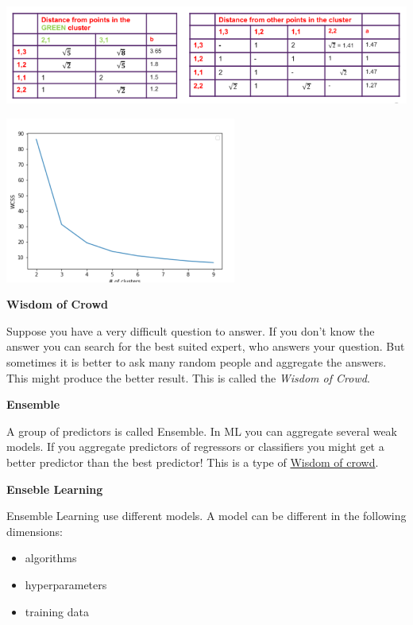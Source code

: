 \documentclass[11pt,landscape]{article}
\begin{document}
\begin{multicols}{3}
\begin{center}
\includegraphics[width=.9\linewidth]{img/silhouette_score_a_b.png}
\end{center}

\begin{center}
\includegraphics[width=.9\linewidth]{img/elbow_method.png}
\end{center}

\textbf{Wisdom of Crowd}

Suppose you have a very difficult question to answer.
If you don't know the answer you can search for the best suited expert, who answers your question.
But sometimes it is better to ask many random people and aggregate the answers.
This might produce the better result.
This is called the \emph{Wisdom of Crowd}.

\textbf{Ensemble}

A group of predictors is called Ensemble.
In ML you can aggregate several weak models.
If you aggregate predictors of regressors or classifiers you might get a better predictor than the best predictor!
This is a type of \href{../../../roam/20211228083830-wisdom_of_crowd.org}{Wisdom of crowd}.

\textbf{Enseble Learning}

Ensemble Learning use different models.
A model can be different in the following dimensions:
\begin{itemize}
\item algorithms
\item hyperparameters
\item training data
\end{itemize}



\end{multicols}
\end{document}
